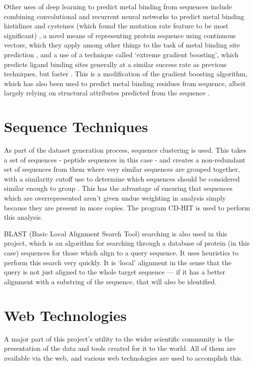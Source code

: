 Other uses of deep learning to predict metal binding from sequences include combining convolutional and recurrent neural networks to predict metal binding histidines and cysteines (which found the mutation rate feature to be most significant) \cite{Haberal2019}, a novel means of representing protein sequence using continuous vectors, which they apply among other things to the task of metal binding site prediction \cite{heinzinger2019}, and a use of a technique called `extreme gradient boosting', which predicts ligand binding sites generally at a similar success rate as previous techniques, but faster \cite{zhao2019}. This is a modification of the gradient boosting algorithm, which has also been used to predict metal binding residues from sequence, albeit largely relying on structural attributes predicted from the sequence \cite{hu2020}.

\section{Sequence Techniques}

As part of the dataset generation process, sequence clustering is used. This takes a set of sequences - peptide sequences in this case - and creates a non-redundant set of sequences from them where very similar sequences are grouped together, with a similarity cutoff use to determine which sequences should be considered similar enough to group . This has the advantage of ensuring that sequences which are overrepresented aren't given undue weighting in analysis simply because they are present in more copies. The program CD-HIT is used to perform this analysis. 

BLAST (Basic Local Alignment Search Tool) searching is also used in this project, which is an algorithm for searching through a database of protein (in this case) sequences for those which align to a query sequence. It uses heuristics to perform this search very quickly. It is `local' alignment in the sense that the query is not just aligned to the whole target sequence --- if it has a better alignment with a substring of the sequence, that will also be identified. 

\section{Web Technologies}

A major part of this project's utility to the wider scientific community is the presentation of the data and tools created for it to the world. All of them are available via the web, and various web technologies are used to accomplish this.

